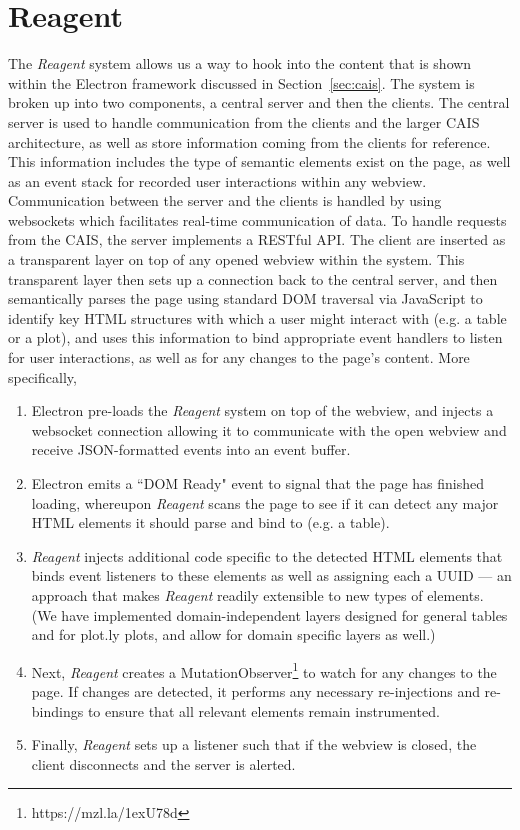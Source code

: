 \section{Reagent}\label{sec:reagent}

The \textit{Reagent} system allows us a way to hook into the content that is
shown within the Electron framework discussed in Section~\ref{sec:cais}. The
system is broken up into two components, a central server and then the clients.
The central server is used to handle communication from the clients and the
larger CAIS architecture, as well as store information coming from the clients
for reference. This information includes the type of semantic elements exist on
the page, as well as an event stack for recorded user interactions within any
webview. Communication between the server and the clients is handled by using
websockets which facilitates real-time communication of data. To handle requests
from the CAIS, the server implements a RESTful API. The client are inserted as a
transparent layer on top of any opened webview within the system.  This
transparent layer then sets up a connection back to the central server, and then
semantically parses the page using standard DOM traversal via JavaScript
to identify key HTML structures with which a user
might interact with (e.g. a table or a plot), and uses this information to bind
appropriate event handlers to listen for user interactions, as well as for any
changes to the page's content. More specifically,

\begin{enumerate}
    \item Electron pre-loads the \textit{Reagent} system on top of the webview, and injects a websocket connection allowing it to communicate with the open webview and receive JSON-formatted events into an event buffer.
    \item Electron emits a ``DOM Ready" event to signal that the page has finished loading, whereupon \textit{Reagent} scans the page to see if it can detect any major HTML elements it should parse and bind to (e.g. a table).
    \item \textit{Reagent} injects additional code specific to the detected HTML elements that binds event listeners to these elements as well as assigning each a UUID --- an approach that makes \textit{Reagent} readily extensible to new types of elements. (We have implemented domain-independent layers designed for general tables and for plot.ly plots, and allow for domain specific layers as well.)
    \item Next, \textit{Reagent} creates a MutationObserver\footnote{https://mzl.la/1exU78d} to watch for any changes to the page. If changes are detected, it performs any necessary re-injections and re-bindings to ensure that all relevant elements remain instrumented.
    \item Finally, \textit{Reagent} sets up a listener such that if the webview
    is closed, the client disconnects and the server is alerted.
\end{enumerate}

